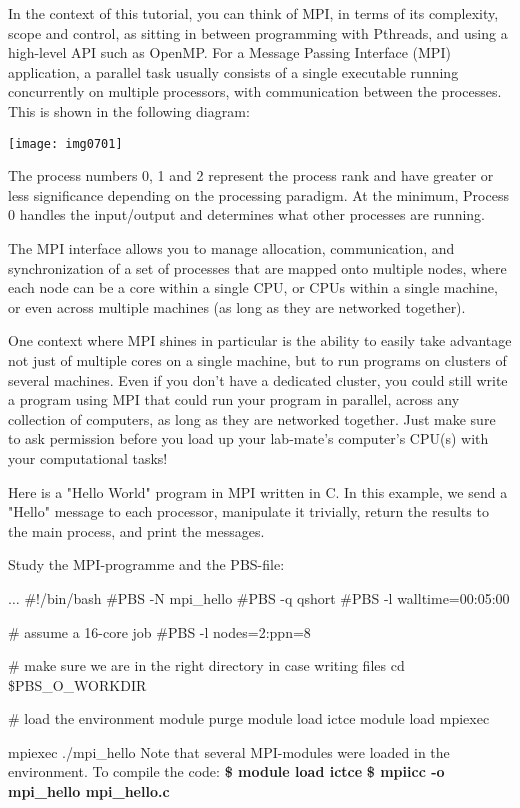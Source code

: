 In the context of this tutorial, you can think of MPI, in terms of its complexity, scope and control, as sitting in between programming with Pthreads, and using a high-level API such as OpenMP. For a Message Passing Interface (MPI) application, a parallel task usually consists of a single executable running concurrently on multiple processors, with communication between the processes.  This is shown in the following diagram:

\texttt{[image: img0701]}

The process numbers 0, 1 and 2 represent the process rank and have greater or less significance depending on the processing paradigm. At the minimum, Process 0 handles the input/output and determines what other processes are running.

The MPI interface allows you to manage allocation, communication, and synchronization of a set of processes that are mapped onto multiple nodes, where each node can be a core within a single CPU, or CPUs within a single machine, or even across multiple machines (as long as they are networked together).

One context where MPI shines in particular is the ability to easily take advantage not just of multiple cores on a single machine, but to run programs on clusters of several machines. Even if you don't have a dedicated cluster, you could still write a program using MPI that could run your program in parallel, across any collection of computers, as long as they are networked together. Just make sure to ask permission before you load up your lab-mate's computer's CPU(s) with your computational tasks!

\begin{prompt}
$ %
\end{prompt}

Here is a "Hello World" program in MPI written in C. In this example, we send a "Hello" message to each processor, manipulate it trivially, return the results to the main process, and print the messages.

Study the MPI-programme and the PBS-file:

\begin{prompt}
$ %
\dots
$ %
\#!/bin/bash
\#PBS -N mpi\_hello
\#PBS -q qshort
\#PBS -l walltime=00:05:00

\# assume a 16-core job
\#PBS -l nodes=2:ppn=8

\# make sure we are in the right directory in case writing files
cd \$PBS\_O\_WORKDIR

\# load the environment
module purge
module load ictce
module load mpiexec

mpiexec   ./mpi\_hello
Note that several MPI-modules were loaded in the environment. To compile the code:
\textbf{\$ module load ictce}
\textbf{\$ mpiicc -o mpi\_hello mpi\_hello.c}
\end{prompt}

